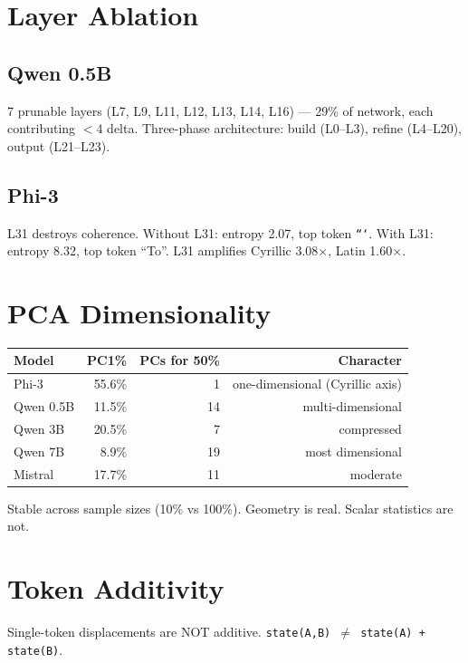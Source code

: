 \documentclass[11pt,a4paper]{report}
\begin{document}
\chapter{Layer Ablation}

\section{Qwen 0.5B}

7 prunable layers (L7, L9, L11, L12, L13, L14, L16) --- 29\% of network, each contributing $<4$ delta. Three-phase architecture: build (L0--L3), refine (L4--L20), output (L21--L23).

\section{Phi-3}

L31 destroys coherence. Without L31: entropy 2.07, top token \texttt{```}. With L31: entropy 8.32, top token ``To''. L31 amplifies Cyrillic 3.08$\times$, Latin 1.60$\times$.

\chapter{PCA Dimensionality}

\begin{center}
\begin{tabular}{lrrr}
\toprule
\textbf{Model} & \textbf{PC1\%} & \textbf{PCs for 50\%} & \textbf{Character} \\
\midrule
Phi-3 & 55.6\% & 1 & one-dimensional (Cyrillic axis) \\
Qwen 0.5B & 11.5\% & 14 & multi-dimensional \\
Qwen 3B & 20.5\% & 7 & compressed \\
Qwen 7B & 8.9\% & 19 & most dimensional \\
Mistral & 17.7\% & 11 & moderate \\
\bottomrule
\end{tabular}
\end{center}

Stable across sample sizes (10\% vs 100\%). Geometry is real. Scalar statistics are not.

\chapter{Token Additivity}

Single-token displacements are NOT additive. \texttt{state(A,B) $\neq$ state(A) + state(B)}.
\end{document}
